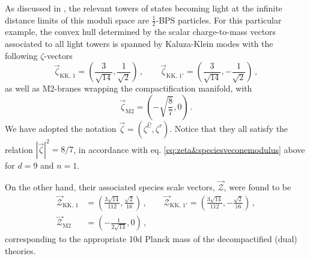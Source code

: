 As discussed in \cite{Etheredge:2022opl}, the relevant towers of states becoming light at the infinite distance limits of this moduli space are $\frac{1}{2}$-BPS particles. For this particular example, the convex hull determined by the scalar charge-to-mass vectors associated to all light towers is spanned by Kaluza-Klein modes with the following $\zeta$-vectors
%
\begin{equation}\label{eq:KKzetas9d}
	\vec{\zeta}_{\text{KK},\, 1} = \left( \frac{3}{\sqrt{14}},\frac{1}{\sqrt{2}} \right) \, , \qquad
	\vec{\zeta}_{\text{KK},\, 1'} = \left( \frac{3}{\sqrt{14}},-\frac{1}{\sqrt{2}}\right) \, ,
\end{equation}
%
as well as M2-branes wrapping the compactification manifold, with
%
\begin{equation}\label{eq:M2zeta9d}
	\vec{\zeta}_{\text{M2}} = \left( -\sqrt{\frac{8}{7}},0 \right) \, .
\end{equation}
%
We have adopted the notation $\vec{\zeta}=\left(\zeta^{\hat U}, \zeta^{\hat \tau} \right)$. Notice that they all satisfy the relation $|\vec{\zeta}|^2=8/7$, in accordance with eq. \eqref{eq:zeta&speciesveconemodulus} above for $d=9$ and $n=1$.
	
On the other hand, their associated species scale vectors, $\vec{\mathcal{Z}}$, were found to be
%
\begin{equation} \label{eq:SSvec9d}
	\begin{split} 
		\vec{\mathcal{Z}}_{\text{KK},\, 1} &= \left( \frac{3\sqrt{14}}{112},\frac{\sqrt{2}}{16} \right) \, , \qquad \vec{\mathcal{Z}}_{\text{KK},\, 1'} = \left( \frac{3\sqrt{14}}{112},-\frac{\sqrt{2}}{16}\right) \, ,\\
		\vec{\mathcal{Z}}_{\text{M2}} &= \left( -\frac{1}{2\sqrt{14}} , 0\right) \, ,
	\end{split}
\end{equation}
%
corresponding to the appropriate 10d Planck mass of the decompactified (dual) theories. %
	
